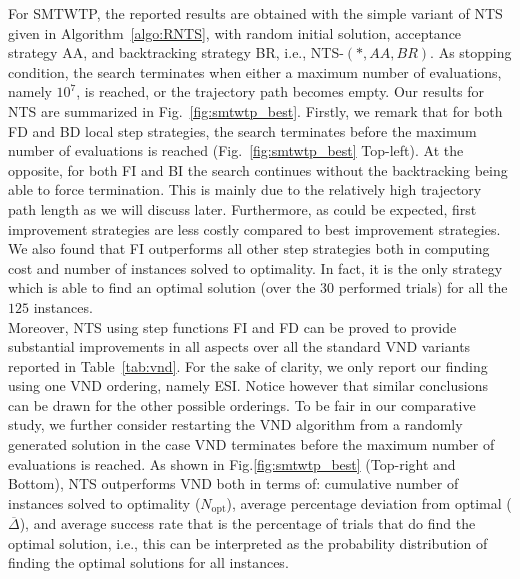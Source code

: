 \documentclass{acm_proc_article-sp}
\begin{document}
For SMTWTP, the reported results are obtained with the simple variant of NTS given in Algorithm~\ref{algo:RNTS}, with random initial solution, acceptance strategy AA, and backtracking strategy BR, i.e., NTS-$(*,AA,BR)$. As stopping condition, the search terminates when either a maximum number of evaluations, namely $10^7$, is reached, or the trajectory path becomes empty. Our results for NTS are summarized in Fig.~\ref{fig:smtwtp_best}. Firstly, we remark that for both FD and BD local step strategies, the search terminates before the maximum number of evaluations is reached (Fig.~\ref{fig:smtwtp_best} Top-left). At the opposite, for both FI and BI the search continues without the backtracking being able to force termination. This is mainly due to the relatively high trajectory path length as we will discuss later. Furthermore, as could be expected, first improvement strategies are less costly compared to best improvement strategies. We also found that FI outperforms all other step strategies both in computing cost and number of instances solved to optimality. In fact, it is the only strategy which is able to find an optimal solution (over the $30$ performed trials) for all the $125$ instances.\\
Moreover, NTS using step functions FI and FD can be proved to provide substantial improvements in all aspects over all the standard VND variants reported in Table~\ref{tab:vnd}. For the sake of clarity, we only report our finding using one VND ordering, namely ESI. Notice however that similar conclusions can be drawn for the other possible orderings. To be fair in our comparative study, we further consider restarting the VND algorithm from a randomly generated solution in the case VND terminates before the maximum number of evaluations is reached. As shown in Fig.\ref{fig:smtwtp_best} (Top-right and Bottom), NTS outperforms VND both in terms of: cumulative number of instances solved to optimality ($N_{\textrm{opt}}$), average percentage deviation from optimal ($\overline{\Delta}$), and average success rate that is the percentage of trials that do find the optimal solution, i.e., this can be interpreted as the probability distribution of finding the optimal solutions for all instances.
\end{document}
